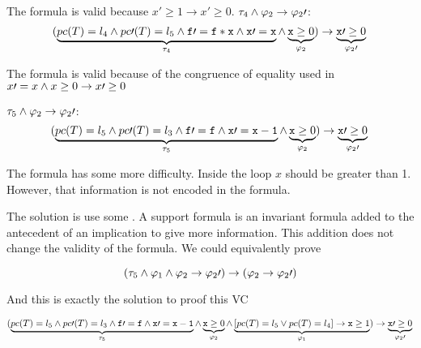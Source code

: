 	The formula is valid because $x\prime \geq 1 \to x\prime \geq 0$.
	\; $\tau_4 \wedge \varphi_2 \to \varphi_2\prime $:	
	\begin{equation*}
		(
			\underbrace{pc(T) = l_4 \wedge pc\prime (T) = l_5 \wedge \mathtt{f}\prime  = \mathtt{f*x} \wedge \mathtt{x\prime =x}}_{\tau_4} \wedge \underbrace{\mathtt{x} \geq 0}_{\varphi_2}
		) 
			\to \underbrace{\mathtt{x}\prime  \geq 0}_{\varphi_2\prime }\\\\
	\end{equation*}


	The formula is valid because of the congruence of equality used in  $x\prime =x \wedge x\geq 0 \to x\prime \geq 0$ 

	\; $\tau_5 \wedge \varphi_2 \to \varphi_2\prime $:	
	\begin{equation*}
		(
			\underbrace{pc(T) = l_5 \wedge pc\prime (T) = l_3 \wedge \mathtt{f\prime =f} \wedge \mathtt{x\prime =x-1}}_{\tau_5} \wedge \underbrace{\mathtt{x} \geq 0}_{\varphi_2}
		) 
			\to \underbrace{\mathtt{x}\prime  \geq 0}_{\varphi_2\prime }\\\\
	\end{equation*}


	The formula has some more difficulty. 
	Inside the loop $x$ should be greater than 1.
	However, that information is not encoded in the formula.
	
	The solution is use some .
	A support formula is an invariant formula added to the antecedent of an implication to give more information. 
	This addition does not change the validity of the formula.
	We could equivalently prove

	\[
		(\tau_5 \wedge \varphi_1 \wedge \varphi_2 \to \varphi_2\prime ) \rightarrow (\varphi_2\to\varphi_2\prime )
	\]

	And this is exactly the solution to proof this \gls{VC}

	

	\begin{equation*}
		(
			\underbrace{pc(T) = l_5 \wedge pc\prime (T) = l_3 \wedge \mathtt{f\prime =f} \wedge \mathtt{x\prime =x-1}}_{\tau_5} \wedge \underbrace{\mathtt{x} \geq 0}_{\varphi_2} \wedge \underbrace{[pc(T) = l_5 \vee pc(T) = l_4] \to \mathtt{x} \geq 1}_{\varphi_1}
		) 
			\to \underbrace{\mathtt{x}\prime  \geq 0}_{\varphi_2\prime }\\\\
	\end{equation*}


